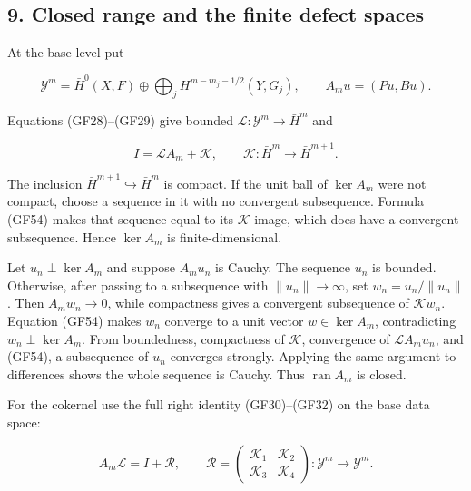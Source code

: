 \documentclass[
  11pt,
]{article}
\makeatletter
\let\ReaderOriginalAnchorStart\hyper@anchorstart
\let\ReaderOriginalAnchorEnd\hyper@anchorend
\let\ReaderPendingAliases\@empty
\def\ReaderArmAliases#1{\gdef\ReaderPendingAliases{#1}}
\def\hyper@anchorstart#1{\ReaderIfNativeAnchorTF{#1}{\ReaderPendingAliases\global\let\ReaderPendingAliases\@empty}{}\ReaderOriginalAnchorStart{#1}}
\makeatother
\begin{document}
\ReaderArmAliases{\ReaderOriginalAnchorStart{AN03-GCF-009}\ReaderOriginalAnchorEnd\begingroup\expandafter\def\csname @currentHref\endcsname{AN03-GCF-009}\label{AN03-GCF-009}\endgroup\ReaderOriginalAnchorStart{9-closed-range-and-the-finite-defect-spaces}\ReaderOriginalAnchorEnd\begingroup\expandafter\def\csname @currentHref\endcsname{9-closed-range-and-the-finite-defect-spaces}\label{9-closed-range-and-the-finite-defect-spaces}\endgroup\ReaderOriginalAnchorStart{closed-range-and-the-finite-defect-spaces}\ReaderOriginalAnchorEnd}
\subsection{9. Closed range and the finite defect
spaces}\label{closed-range-and-the-finite-defect-spaces}

At the base level put

\[
 \mathcal Y^m=\bar H^0(X,F)\oplus
 \bigoplus_jH^{m-m_j-1/2}(Y,G_j),
 \qquad
 A_m u=(Pu,Bu).
 \tag{GF53}
\]

Equations (GF28)--(GF29) give bounded
\(\mathscr L:\mathcal Y^m\to\bar H^m\) and

\[
 I=\mathscr L A_m+\mathscr K,
 \qquad
 \mathscr K:\bar H^m\longrightarrow\bar H^{m+1}.
 \tag{GF54}
\]

The inclusion \(\bar H^{m+1}\hookrightarrow\bar H^m\) is compact. If the
unit ball of \(\ker A_m\) were not compact, choose a sequence in it with
no convergent subsequence. Formula (GF54) makes that sequence equal to
its \(\mathscr K\)-image, which does have a convergent subsequence.
Hence \(\ker A_m\) is finite-dimensional.

Let \(u_n\perp\ker A_m\) and suppose \(A_mu_n\) is Cauchy. The sequence
\(u_n\) is bounded. Otherwise, after passing to a subsequence with
\(\|u_n\|\to\infty\), set \(w_n=u_n/\|u_n\|\). Then \(A_mw_n\to0\),
while compactness gives a convergent subsequence of \(\mathscr Kw_n\).
Equation (GF54) makes \(w_n\) converge to a unit vector
\(w\in\ker A_m\), contradicting \(w_n\perp\ker A_m\). From boundedness,
compactness of \(\mathscr K\), convergence of \(\mathscr LA_mu_n\), and
(GF54), a subsequence of \(u_n\) converges strongly. Applying the same
argument to differences shows the whole sequence is Cauchy. Thus
\(\operatorname{ran}A_m\) is closed.

For the cokernel use the full right identity (GF30)--(GF32) on the base
data space:

\[
 A_m\mathscr L=I+\mathscr R,\qquad
 \mathscr R=
 \begin{pmatrix}
 \mathscr K_1&\mathscr K_2\\
 \mathscr K_3&\mathscr K_4
 \end{pmatrix}:\mathcal Y^m\longrightarrow\mathcal Y^m.
 \tag{GF54R}
\]
\end{document}
